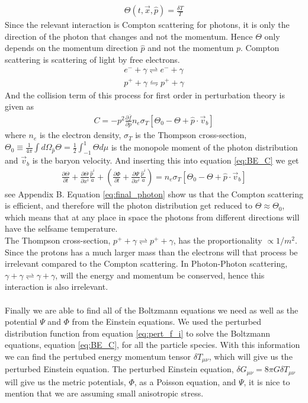 \documentclass{aa}
\begin{document}
\begin{align}
    \Theta(t,\vec{x},\hat{p}) = \frac{\delta T}{T}
\end{align}
Since the relevant interaction is Compton scattering for photons, it is only the direction of the photon that changes and not the momentum. Hence $\Theta$ only depends on the momentum direction $\hat{p}$ and not the momentum $p$. Compton scattering is scattering of light by free electrons. 
\begin{align*}
    e^- + \gamma \rightleftharpoons e^- + \gamma\\
    p^+ + \gamma \leftrightharpoons p^+ + \gamma
\end{align*}
And the collision term of this process for first order in perturbation theory is given as
\begin{align}
    C = -p^2\frac{\partial \overline{f}}{\partial p}n_e \sigma_T[\Theta_0 - \Theta + \hat{p}\cdot \vec{v}_b]
\end{align}
where $n_e$ is the electron density, $\sigma_T$ is the Thompson cross-section, $\Theta_0 \equiv \frac{1}{4\pi}\int d\Omega_{\hat{p}} \Theta = \frac{1}{2}\int_{-1}^1 \Theta d\mu$ is the monopole moment of the photon distribution and $\Vec{v}_b$ is the baryon velocity. And inserting this into equation \eqref{eq:BE_C} we get 
\begin{align}
    \frac{\partial \Theta}{\partial t} + \frac{\partial \Theta}{\partial x^i} \frac{\hat{p}^i}{a} + (\frac{\partial \Phi}{\partial t} + \frac{\partial \Psi}{\partial x^i}\frac{\hat{p}^i}{a}) = n_e \sigma_T[\Theta_0 - \Theta + \hat{p}\cdot \vec{v}_b] \label{eq:final_photon}
\end{align}
see Appendix B.
Equation \eqref{eq:final_photon} show us that the Compton scattering is efficient, and therefore will the photon distribution get reduced to $\Theta \approx \Theta_0$, which means that at any place in space the photons from different directions will have the selfsame temperature. \\
The Thompson cross-section, $p^+ + \gamma \rightleftharpoons p^+ + \gamma$, has the proportionality $\propto1/m^2$. Since the protons has a much larger mass than the electrons will that process be irrelevant compared to the Compton scattering. In Photon-Photon scattering, $\gamma + \gamma \rightleftharpoons \gamma + \gamma$, will the energy and momentum be conserved, hence this interaction is also irrelevant.  \\
\\
Finally we are able to find all of the Boltzmann equations we need as well as the potential $\Psi$ and $\Phi$ from the Einstein equations. We used the perturbed distribution function from equation \eqref{eq:pert_f_i} to solve the Boltzmann equations, equation \eqref{eq:BE_C}, for all the particle species. With this information we can find the pertubed energy momentum tensor $\delta T_{\mu\nu}$, which will give us the perturbed Einstein equation. The perturbed Einstein equation, $\delta G_{\mu\nu}=8\pi G\delta T_{\mu\nu}$ will give us the metric potentials, $\Phi$, as a Poisson equation, and $\Psi$, it is nice to mention that we are assuming small anisotropic stress. \\
\end{document}
